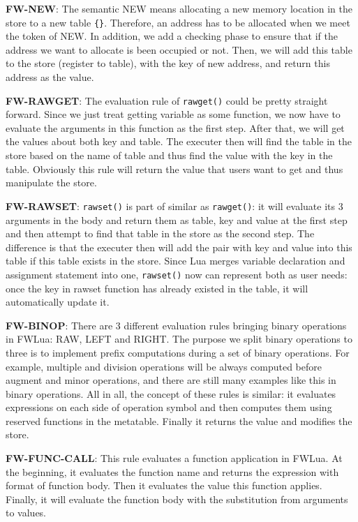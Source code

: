{\bf FW-NEW}: The semantic NEW means allocating a new memory location in the store to a new table {\tt \{\}}. Therefore, an address has to be allocated when we meet the token of NEW. In addition, we add a checking phase to ensure that if the address we want to allocate is been occupied or not. Then, we will add this table to the store (register to table), with the key of new address, and return this address as the value.

{\bf FW-RAWGET}: The evaluation rule of {\tt rawget()} could be pretty straight forward. Since we just treat getting variable as some function, we now have to evaluate the arguments in this function as the first step. After that, we will get the values about both key and table. The executer then will find the table in the store based on the name of table and thus find the value with the key in the table. Obviously this rule will return the value that users want to get and thus manipulate the store.

{\bf FW-RAWSET}: {\tt rawset()} is part of similar as {\tt rawget()}: it will evaluate its 3 arguments in the body and return them as table, key and value at the first step and then attempt to find that table in the store as the second step. The difference is that the executer then will add the pair with key and value into this table if this table exists in the store. Since Lua merges variable declaration and assignment statement into one, {\tt rawset()} now can represent both as user needs: once the key in rawset function has already existed in the table, it will automatically update it.

{\bf FW-BINOP}: There are 3 different evaluation rules bringing binary operations in FWLua: RAW, LEFT and RIGHT. The purpose we split binary operations to three is to implement prefix computations during a set of binary operations. For example, multiple and division operations will be always computed before augment and minor operations, and there are still many examples like this in binary operations. All in all, the concept of these rules is similar: it evaluates expressions on each side of operation symbol and then computes them using reserved functions in the metatable. Finally it returns the value and modifies the store. 

{\bf FW-FUNC-CALL}: This rule evaluates a function application in FWLua. At the beginning, it evaluates the function name and returns the expression with format of function body. Then it evaluates the value this function applies. Finally, it will evaluate the function body with the substitution from arguments to values. 

